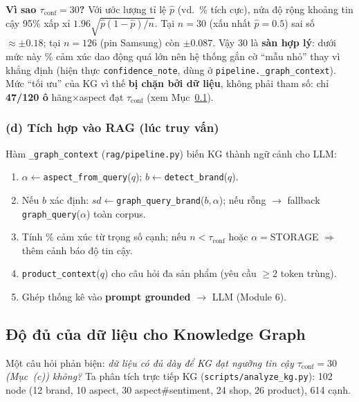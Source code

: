 \documentclass[12pt,a4paper]{article}
\begin{document}
\noindent\textbf{Vì sao $\tau_{\text{conf}}=30$?} Với ước lượng tỉ lệ $\hat p$ (vd.\ \% tích cực), nửa độ rộng khoảng tin cậy 95\% xấp xỉ $1.96\sqrt{\hat p(1-\hat p)/n}$. Tại $n=30$ (xấu nhất $\hat p{=}0.5$) sai số $\approx\pm0.18$; tại $n=126$ (pin Samsung) còn $\pm0.087$. Vậy $30$ là \textbf{sàn hợp lý}: dưới mức này \% cảm xúc dao động quá lớn nên hệ thống gắn cờ ``mẫu nhỏ'' thay vì khẳng định (hiện thực \texttt{confidence\_note}, dùng ở \texttt{pipeline.\_graph\_context}). Mức ``tối ưu'' của KG vì thế \textbf{bị chặn bởi dữ liệu}, không phải tham số: chỉ \textbf{47/120 ô} hãng$\times$aspect đạt $\tau_{\text{conf}}$ (xem Mục~\ref{sec:kg-data}).

\subsubsection*{(d) Tích hợp vào RAG (lúc truy vấn)}
Hàm \texttt{\_graph\_context} (\texttt{rag/pipeline.py}) biến KG thành ngữ cảnh cho LLM:
\begin{enumerate}[leftmargin=1.5cm,itemsep=0pt]
  \item $\alpha\gets$\texttt{aspect\_from\_query}($q$); \; $b\gets$\texttt{detect\_brand}($q$).
  \item Nếu $b$ xác định: $sd\gets$\texttt{graph\_query\_brand}($b,\alpha$); nếu rỗng $\to$ fallback \texttt{graph\_query}($\alpha$) toàn corpus.
  \item Tính \% cảm xúc từ trọng số cạnh; nếu $n<\tau_{\text{conf}}$ hoặc $\alpha{=}$STORAGE $\Rightarrow$ thêm cảnh báo độ tin cậy.
  \item \texttt{product\_context}($q$) cho câu hỏi đa sản phẩm (yêu cầu $\geq$2 token trùng).
  \item Ghép thống kê vào \textbf{prompt grounded} $\to$ LLM (Module 6).
\end{enumerate}

\subsection{Độ đủ của dữ liệu cho Knowledge Graph}
\label{sec:kg-data}

Một câu hỏi phản biện: \textit{dữ liệu có đủ dày để KG đạt ngưỡng tin cậy $\tau_{\text{conf}}{=}30$ (Mục~(c)) không?} Ta phân tích trực tiếp KG (\texttt{scripts/analyze\_kg.py}): 102 node (12 brand, 10 aspect, 30 aspect\#sentiment, 24 shop, 26 product), 614 cạnh.
\end{document}

